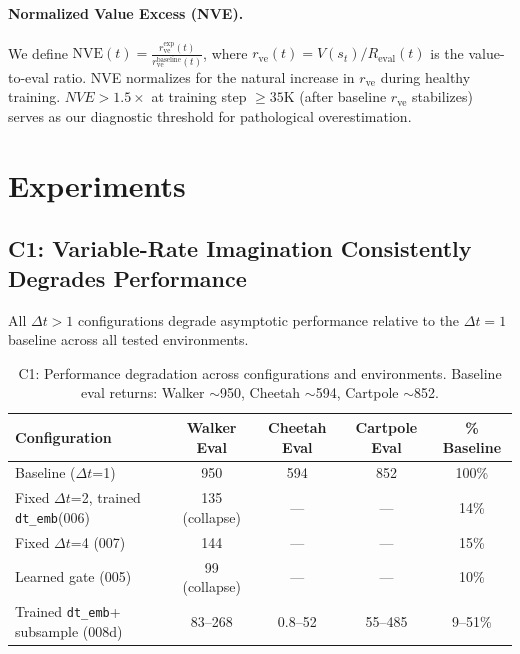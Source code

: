 \documentclass[letterpaper]{article}
\newcommand{\nve}{NVE\xspace}
\newcommand{\dtemb}{\texttt{dt\_emb}\xspace}
\begin{document}
\paragraph{Normalized Value Excess (NVE).}
We define $\text{NVE}(t) = \frac{r_{\text{ve}}^{\text{exp}}(t)}{r_{\text{ve}}^{\text{baseline}}(t)}$, where $r_{\text{ve}}(t) = V(s_t) / R_{\text{eval}}(t)$ is the value-to-eval ratio. \nve normalizes for the natural increase in $r_{\text{ve}}$ during healthy training. $\nve > 1.5\times$ at training step $\geq 35$K (after baseline $r_{\text{ve}}$ stabilizes) serves as our diagnostic threshold for pathological overestimation.

\section{Experiments}

\subsection{C1: Variable-Rate Imagination Consistently Degrades Performance}

All $\Delta t > 1$ configurations degrade asymptotic performance relative to the $\Delta t = 1$ baseline across all tested environments.

\begin{table}[h]
\centering
\caption{C1: Performance degradation across configurations and environments. Baseline eval returns: Walker $\sim$950, Cheetah $\sim$594, Cartpole $\sim$852.}
\label{tab:c1_degradation}
\begin{tabular}{lcccc}
\toprule
Configuration & Walker Eval & Cheetah Eval & Cartpole Eval & \% Baseline \\
\midrule
Baseline ($\Delta t$=1) & 950 & 594 & 852 & 100\% \\
Fixed $\Delta t$=2, trained \dtemb (006) & 135 (collapse) & --- & --- & 14\% \\
Fixed $\Delta t$=4 (007) & 144 & --- & --- & 15\% \\
Learned gate (005) & 99 (collapse) & --- & --- & 10\% \\
Trained \dtemb + subsample (008d) & 83--268 & 0.8--52 & 55--485 & 9--51\% \\
\bottomrule
\end{tabular}
\end{table}
\end{document}
